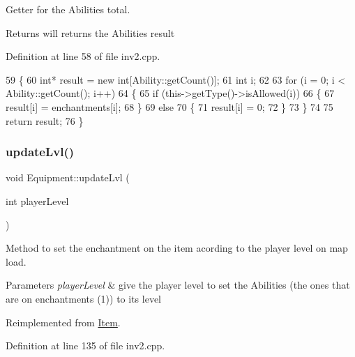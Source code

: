Getter for the Abilities total. 

\begin{DoxyReturn}{Returns}
will returns the Abilities result 
\end{DoxyReturn}


Definition at line 58 of file inv2.\+cpp.


\begin{DoxyCode}
59 \{
60     \textcolor{keywordtype}{int}* result = \textcolor{keyword}{new} \textcolor{keywordtype}{int}[Ability::getCount()];
61     \textcolor{keywordtype}{int} i;
62 
63     \textcolor{keywordflow}{for} (i = 0; i < Ability::getCount(); i++)
64     \{
65         \textcolor{keywordflow}{if} (this->getType()->isAllowed(i))
66         \{
67             result[i] = enchantments[i];
68         \}
69         \textcolor{keywordflow}{else}
70         \{
71             result[i] = 0;
72         \}
73     \}
74 
75     \textcolor{keywordflow}{return} result;
76 \}
\end{DoxyCode}
\hypertarget{class_equipment_ab56d6a16b2151d7793c4b5fddde1f145}{}\label{class_equipment_ab56d6a16b2151d7793c4b5fddde1f145} 
\subsubsection{\texorpdfstring{update\+Lvl()}{updateLvl()}}
{\footnotesize\ttfamily void Equipment\+::update\+Lvl (\begin{DoxyParamCaption}\item[{int}]{player\+Level }\end{DoxyParamCaption})\hspace{0.3cm}{\ttfamily [virtual]}}



Method to set the enchantment on the item acording to the player level on map load. 


\begin{DoxyParams}{Parameters}
{\em player\+Level} & give the player level to set the Abilities (the ones that are on enchantments (1)) to it\textquotesingle{}s level \\
\hline
\end{DoxyParams}


Reimplemented from \hyperlink{class_item}{Item}.



Definition at line 135 of file inv2.\+cpp.


